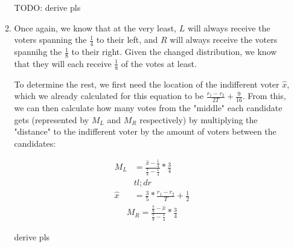 \documentclass[12pt,letterpaper]{article}
\begin{document}
\begin{enumerate}
\begin{enumerate}
	{\color{red} TODO: derive pls}

	\item Once again, we know that at the very least, $L$ will always receive the voters spanning the $\frac{1}{4}$ to their left, and $R$ will always receive the voters spannihg the $\frac{1}{8}$ to their right. Given the changed distribution, we know that they will each receive $\frac{1}{8}$ of the votes at least.
	
	To determine the rest, we first need the location of the indifferent voter $\hat{x}$, which we already calculated for this equation to be $\frac{r_1 - r_2}{2T} + \frac{9}{16}$. From this, we can then calculate how many votes from the "middle" each candidate gets (represented by $M_L$ and $M_R$ respectively) by multiplying the "distance" to the indifferent voter by the amount of voters between the candidates:

	\begin{multicols}{2}
		\noindent
		\begin{align*}
			M_L &= \frac{\hat{x} - \frac{1}{4}}{\frac{7}{8} - \frac{1}{4}} * \frac{3}{4} \\
			&tl;dr \\
			\hat{x} &= \frac{3}{5} * \frac{r_1 - r_2}{T} + \frac{1}{2}
		\end{align*}
		\begin{align*}
			M_R = \frac{\frac{7}{8} - \hat{x}}{\frac{7}{8} - \frac{1}{4}} * \frac{3}{4}
		\end{align*}		
	\end{multicols}

	{\color{red} derive pls}

\end{enumerate}

\end{enumerate}
	
\end{document}
